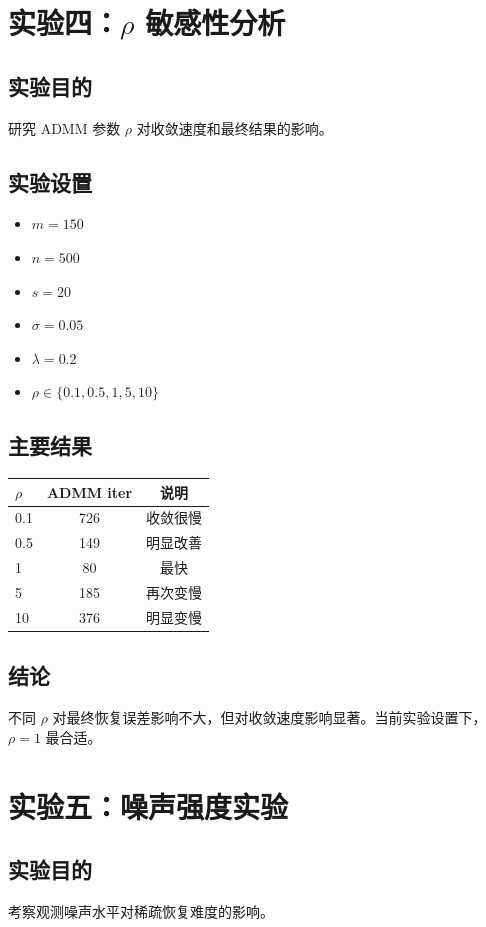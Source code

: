 \documentclass[12pt,a4paper]{ctexart}
\begin{document}
\section{实验四：$\rho$ 敏感性分析}
\subsection{实验目的}
研究 ADMM 参数 $\rho$ 对收敛速度和最终结果的影响。

\subsection{实验设置}
\begin{itemize}[leftmargin=2em]
    \item $m=150$
    \item $n=500$
    \item $s=20$
    \item $\sigma=0.05$
    \item $\lambda=0.2$
    \item $\rho \in \{0.1, 0.5, 1, 5, 10\}$
\end{itemize}

\subsection{主要结果}
\begin{center}
\begin{tabular}{lcc}
\toprule
$\rho$ & ADMM iter & 说明 \\
\midrule
0.1 & 726 & 收敛很慢 \\
0.5 & 149 & 明显改善 \\
1 & 80 & 最快 \\
5 & 185 & 再次变慢 \\
10 & 376 & 明显变慢 \\
\bottomrule
\end{tabular}
\end{center}

\subsection{结论}
不同 $\rho$ 对最终恢复误差影响不大，但对收敛速度影响显著。当前实验设置下，$\rho=1$ 最合适。

\section{实验五：噪声强度实验}
\subsection{实验目的}
考察观测噪声水平对稀疏恢复难度的影响。
\end{document}
